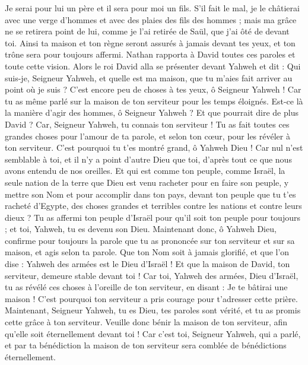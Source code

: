 \begin{multicols}{2}
Je serai pour lui un père et il sera pour moi un fils. S'il fait le mal, je le châtierai avec une verge d'hommes et avec des plaies des fils des hommes ;
mais ma grâce ne se retirera point de lui, comme je l'ai retirée de Saül, que j'ai ôté de devant toi.
Ainsi ta maison et ton règne seront assurés à jamais devant tes yeux, et ton trône sera pour toujours affermi.
Nathan rapporta à David toutes ces paroles et toute cette vision.
Alors le roi David alla se présenter devant Yahweh et dit : Qui suis-je, Seigneur Yahweh, et quelle est ma maison, que tu m'aies fait arriver au point où je suis ?
C'est encore peu de choses à tes yeux, ô Seigneur Yahweh ! Car tu as même parlé sur la maison de ton serviteur pour les temps éloignés. Est-ce là la manière d'agir des hommes, ô Seigneur Yahweh ?
Et que pourrait dire de plus David ? Car, Seigneur Yahweh, tu connais ton serviteur !
Tu as fait toutes ces grandes choses pour l'amour de ta parole, et selon ton cœur, pour les révéler à ton serviteur.
C'est pourquoi tu t'es montré grand, ô Yahweh Dieu ! Car nul n'est semblable à toi, et il n'y a point d'autre Dieu que toi, d'après tout ce que nous avons entendu de nos oreilles.
Et qui est comme ton peuple, comme Israël, la seule nation de la terre que Dieu est venu racheter pour en faire son peuple, y mettre son Nom et pour accomplir dans ton pays, devant ton peuple que tu t'es racheté d'Egypte, des choses grandes et terribles contre les nations et contre leurs dieux ?
Tu as affermi ton peuple d'Israël pour qu'il soit ton peuple pour toujours ; et toi, Yahweh, tu es devenu son Dieu.
Maintenant donc, ô Yahweh Dieu, confirme pour toujours la parole que tu as prononcée sur ton serviteur et sur sa maison, et agis selon ta parole.
Que ton Nom soit à jamais glorifié, et que l'on dise : Yahweh des armées est le Dieu d'Israël ! Et que la maison de David, ton serviteur, demeure stable devant toi !
Car toi, Yahweh des armées, Dieu d'Israël, tu as révélé ces choses à l'oreille de ton serviteur, en disant : Je te bâtirai une maison ! C'est pourquoi ton serviteur a pris courage pour t'adresser cette prière.
Maintenant, Seigneur Yahweh, tu es Dieu, tes paroles sont vérité, et tu as promis cette grâce à ton serviteur.
Veuille donc bénir la maison de ton serviteur, afin qu'elle soit éternellement devant toi ! Car c'est toi, Seigneur Yahweh, qui a parlé, et par ta bénédiction la maison de ton serviteur sera comblée de bénédictions éternellement.

\end{multicols}
